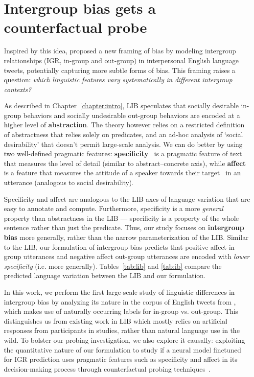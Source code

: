 \chapter{Intergroup bias gets a counterfactual probe}
\label{chapter:probing}

Inspired by this idea, \citet{govindarajan-etal-2023-people} proposed a new framing of bias by modeling intergroup relationships (IGR, in-group and out-group) in interpersonal English language tweets, potentially capturing more subtle forms of bias. This framing raises a question: \emph{which linguistic features vary systematically in different intergroup contexts?}

As described in Chapter~\ref{chapter:intro}, LIB speculates that socially desirable in-group behaviors and socially undesirable out-group behaviors are encoded at a higher level of \textbf{abstraction}. The theory however relies on a restricted definition of abstractness that relies solely on predicates, and an ad-hoc analysis of `social desirability' that doesn't permit large-scale analysis. We can do better by using two well-defined pragmatic features: \textbf{specificity}~\citep{li_discourse_2017} is a pragmatic feature of text that measures the level of detail (similar to abstract--concrete axis), while \textbf{affect} is a feature that measures the attitude of a speaker towards their target~\citep{sheng-etal-2019-woman} in an utterance (analogous to social desirability).

Specificity and affect are analogous to the LIB axes of language variation that are easy to annotate and compute. Furthermore, specificity is a more \emph{general} property than abstractness in the LIB --- specificity is a property of the whole sentence rather than just the predicate. Thus, our study focuses on \textbf{intergroup bias} more generally, rather than the narrow parameterization of the LIB. Similar to the LIB, our formulation of intergroup bias predicts that positive affect in-group utterances and negative affect out-group utterances are encoded with \emph{lower specificity} (i.e. more generally). Tables~\ref{tab:lib} and \ref{tab:ib} compare the predicted language variation between the LIB and our formulation. 

In this work, we perform the first large-scale study of linguistic differences in intergroup bias by analyzing its nature in the corpus of English tweets from \citet{govindarajan-etal-2023-people}, which makes use of naturally occurring labels for in-group vs. out-group. This distinguishes us from existing work in LIB which mostly relies on artificial responses from participants in studies, rather than natural language use in the wild. To bolster our probing investigation, we also explore it causally: exploiting the quantitative nature of our formulation to study if a neural model finetuned for IGR prediction uses pragmatic features such as specificity and affect in its decision-making process through counterfactual probing techniques~\citep{ravfogel-etal-2021-counterfactual}.

